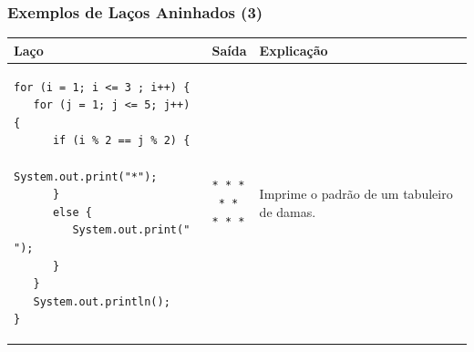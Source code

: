 \documentclass[xcolor={dvipsnames,table},aspectratio=169]{beamer}
\begin{document}
\begin{frame}[fragile]\frametitle{Exemplos de Laços Aninhados (3)}
\begin{center}
  \begin{tabular}{|p{6cm}|p{2cm}|p{5cm}|}
\hline
    \textbf{Laço} & \textbf{Saída} & \textbf{Explicação} \\
\hline
{\tiny
\begin{verbatim}
for (i = 1; i <= 3 ; i++) {
   for (j = 1; j <= 5; j++) {
      if (i % 2 == j % 2) {
         System.out.print("*");
      }
      else {
         System.out.print(" ");
      }
   }
   System.out.println();
}
\end{verbatim}
}
&
{\tiny
\begin{verbatim}
* * *
 * * 
* * *
\end{verbatim}
}
& Imprime o padrão de um tabuleiro de damas.\\
\hline
  \end{tabular}
\end{center}
\end{frame}
\end{document}
